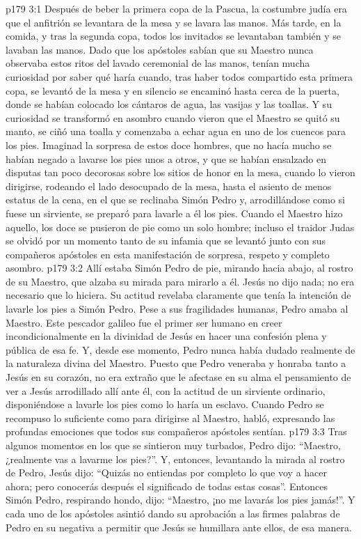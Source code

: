\vs p179 3:1 Después de beber la primera copa de la Pascua, la costumbre judía era que el anfitrión se levantara de la mesa y se lavara las manos. Más tarde, en la comida, y tras la segunda copa, todos los invitados se levantaban también y se lavaban las manos. Dado que los apóstoles sabían que su Maestro nunca observaba estos ritos del lavado ceremonial de las manos, tenían mucha curiosidad por saber qué haría cuando, tras haber todos compartido esta primera copa, se levantó de la mesa y en silencio se encaminó hasta cerca de la puerta, donde se habían colocado los cántaros de agua, las vasijas y las toallas. Y su curiosidad se transformó en asombro cuando vieron que el Maestro se quitó su manto, se ciñó una toalla y comenzaba a echar agua en uno de los cuencos para los pies. Imaginad la sorpresa de estos doce hombres, que no hacía mucho se habían negado a lavarse los pies unos a otros, y que se habían ensalzado en disputas tan poco decorosas sobre los sitios de honor en la mesa, cuando lo vieron dirigirse, rodeando el lado desocupado de la mesa, hasta el asiento de menos estatus de la cena, en el que se reclinaba Simón Pedro y, arrodillándose como si fuese un sirviente, se preparó para lavarle a él los pies. Cuando el Maestro hizo aquello, los doce se pusieron de pie como un solo hombre; incluso el traidor Judas se olvidó por un momento tanto de su infamia que se levantó junto con sus compañeros apóstoles en esta manifestación de sorpresa, respeto y completo asombro.
\vs p179 3:2 Allí estaba Simón Pedro de pie, mirando hacia abajo, al rostro de su Maestro, que alzaba su mirada para mirarlo a él. Jesús no dijo nada; no era necesario que lo hiciera. Su actitud revelaba claramente que tenía la intención de lavarle los pies a Simón Pedro. Pese a sus fragilidades humanas, Pedro amaba al Maestro. Este pescador galileo fue el primer ser humano en creer incondicionalmente en la divinidad de Jesús  en hacer una confesión plena y pública de esa fe. Y, desde ese momento, Pedro nunca había dudado realmente de la naturaleza divina del Maestro. Puesto que Pedro veneraba y honraba tanto a Jesús en su corazón, no era extraño que le afectase en su alma el pensamiento de ver a Jesús arrodillado allí ante él, con la actitud de un sirviente ordinario, disponiéndose a lavarle los pies como lo haría un esclavo. Cuando Pedro se recompuso lo suficiente como para dirigirse al Maestro, habló, expresando las profundas emociones que todos sus compañeros apóstoles sentían.
\vs p179 3:3 Tras algunos momentos en los que se sintieron muy turbados, Pedro dijo: “Maestro, ¿realmente vas a lavarme los pies?”. Y, entonces, levantando la mirada al rostro de Pedro, Jesús dijo: “Quizás no entiendas por completo lo que voy a hacer ahora; pero conocerás después el significado de todas estas cosas”. Entonces Simón Pedro, respirando hondo, dijo: “Maestro, ¡no me lavarás los pies jamás!”. Y cada uno de los apóstoles asintió dando su aprobación a las firmes palabras de Pedro en su negativa a permitir que Jesús se humillara ante ellos, de esa manera.
